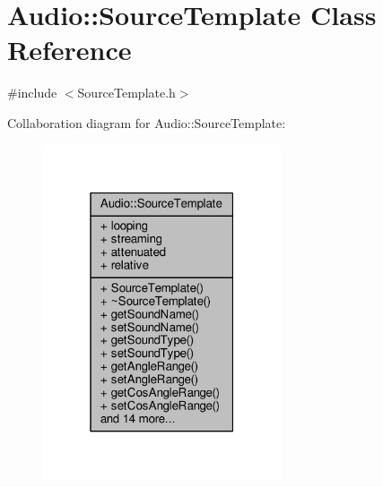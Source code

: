 \hypertarget{classAudio_1_1SourceTemplate}{}\section{Audio\+:\+:Source\+Template Class Reference}
\label{classAudio_1_1SourceTemplate}


{\ttfamily \#include $<$Source\+Template.\+h$>$}



Collaboration diagram for Audio\+:\+:Source\+Template\+:
\nopagebreak
\begin{figure}[H]
\begin{center}
\leavevmode
\includegraphics[width=199pt]{d0/daf/classAudio_1_1SourceTemplate__coll__graph}
\end{center}
\end{figure}
